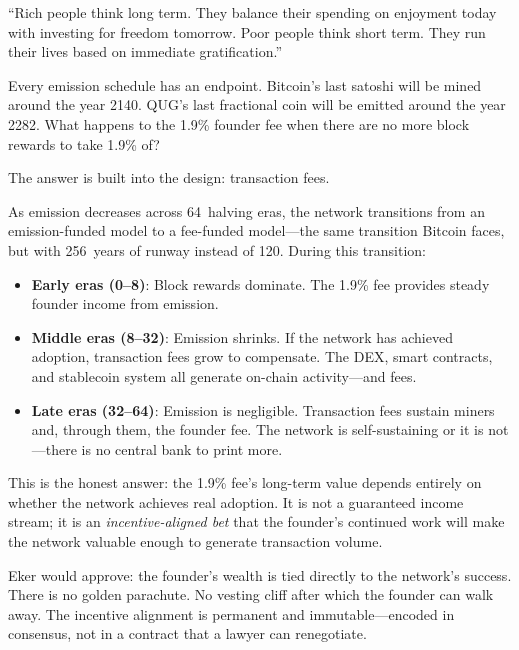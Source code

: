 \documentclass[11pt,a4paper]{article}
\begin{document}
\begin{wealthbox}[title={\raisebox{-0.5pt}{\tiny$\bigstar$} Wealth File \#11}]
``Rich people think long term. They balance their spending on enjoyment
today with investing for freedom tomorrow. Poor people think short
term. They run their lives based on immediate gratification.''
\end{wealthbox}

\vspace{0.3cm}

Every emission schedule has an endpoint. Bitcoin's last satoshi will be
mined around the year 2140. QUG's last fractional coin will be emitted
around the year 2282. What happens to the 1.9\% founder fee when there
are no more block rewards to take 1.9\% of?

The answer is built into the design: transaction fees.

As emission decreases across 64~halving eras, the network transitions
from an emission-funded model to a fee-funded model---the same
transition Bitcoin faces, but with 256~years of runway instead of 120.
During this transition:

\begin{itemize}[leftmargin=2em]
    \item \textbf{Early eras (0--8)}: Block rewards dominate. The 1.9\%
          fee provides steady founder income from emission.
    \item \textbf{Middle eras (8--32)}: Emission shrinks. If the network
          has achieved adoption, transaction fees grow to compensate.
          The DEX, smart contracts, and stablecoin system all generate
          on-chain activity---and fees.
    \item \textbf{Late eras (32--64)}: Emission is negligible.
          Transaction fees sustain miners and, through them, the founder
          fee. The network is self-sustaining or it is not---there is
          no central bank to print more.
\end{itemize}

This is the honest answer: the 1.9\% fee's long-term value depends
entirely on whether the network achieves real adoption. It is not a
guaranteed income stream; it is an \emph{incentive-aligned bet} that the
founder's continued work will make the network valuable enough to
generate transaction volume.

Eker would approve: the founder's wealth is tied directly to the
network's success. There is no golden parachute. No vesting cliff
after which the founder can walk away. The incentive alignment is
permanent and immutable---encoded in consensus, not in a contract that
a lawyer can renegotiate.
\end{document}
